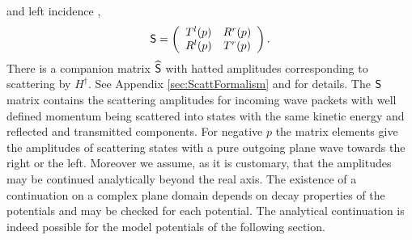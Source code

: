 and left incidence \cite{Muga2004},
%
\begin{equation}
\sf{S}=\left(\begin{array}{cc}
T^l(p)&R^r(p)
\\
R^l(p)&T^r(p)
\end{array}\right).
\end{equation}
%
There is a companion matrix $\widehat{\sf{S}}$ with hatted amplitudes corresponding to scattering by $H^{\dagger}$. See Appendix \ref{sec:ScattFormalism} and \cite{Muga2004} for details. The $\sf{S}$ matrix contains the scattering amplitudes for incoming wave packets with well defined momentum being scattered into states with the same kinetic energy and reflected and transmitted components.
%
For negative $p$ the matrix elements give the amplitudes of scattering states with a pure outgoing plane wave towards the right or the left.
Moreover we assume, as it is customary,
that the amplitudes may be continued analytically beyond the real axis.
The existence of a continuation on a complex plane domain depends on decay properties of the potentials and may
be checked for each potential.
The analytical continuation is indeed possible for the model potentials of the following section.



